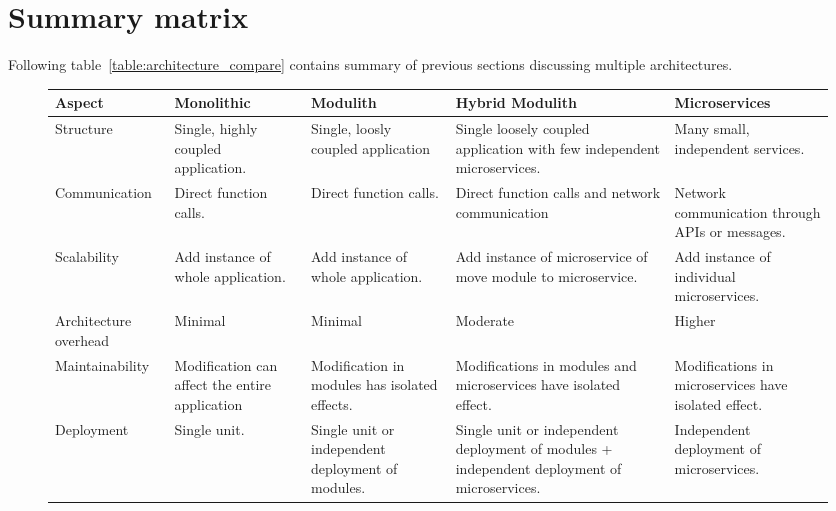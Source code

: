\section{Summary matrix}
Following table~\ref{table:architecture_compare} contains summary of previous sections discussing multiple architectures.


\begin{sidewaysfigure}
    \begin{tabular}{ |p{2.7cm}|p{3cm}|p{3cm}|p{4cm}|p{3cm}| }
        \hline
        \textbf{Aspect}       & \textbf{Monolithic}                            & \textbf{Modulith}                                    & \textbf{Hybrid Modulith}                                                                    & \textbf{Microservices}                                \\
        \hline
        Structure             & Single, highly coupled   application.          & Single, loosly coupled application                   & Single loosely coupled application with few independent microservices.                      & Many small, independent services.                     \\
        \hline
        Communication         & Direct function calls.                         & Direct function calls.                               & Direct function calls and network communication                                             & Network communication through APIs or messages.       \\
        \hline
        Scalability           & Add instance of whole application.             & Add instance of whole application.                   & Add instance of microservice of move module to microservice.                                & Add instance of individual microservices.             \\
        \hline
        Architecture overhead & Minimal                                        & Minimal                                              & Moderate                                                                                    & Higher                                                \\
        \hline
        Maintainability       & Modification can affect the entire application & Modification in modules has isolated effects.        & Modifications in modules and microservices have isolated effect.                            & Modifications in microservices have isolated effect.  \\
        \hline
        Deployment            & Single unit.                                   & Single unit or independent deployment of modules.    & Single unit or independent deployment of modules + independent deployment of microservices. & Independent deployment of microservices.              \\

\end{tabular}
\end{sidewaysfigure}
